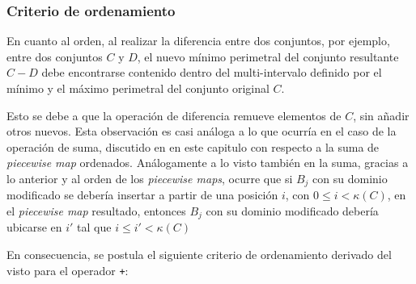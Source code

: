 \subsubsection{Criterio de ordenamiento}

En cuanto al orden, al realizar la diferencia entre dos conjuntos, por ejemplo, entre dos conjuntos $C$ y $D$, el nuevo mínimo perimetral del conjunto resultante $C - D$ debe encontrarse contenido dentro del multi-intervalo definido por el mínimo y el máximo perimetral del conjunto original $C$. 

Esto se debe a que la operación de diferencia remueve elementos de $C$, sin añadir otros nuevos. Esta observación es casi análoga a lo que ocurría en el caso de la operación de suma, discutido en en este capitulo con respecto a la suma de \textit{piecewise map} ordenados. Análogamente a lo visto también en la suma, gracias a lo anterior y al orden de los \textit{piecewise maps}, ocurre que si $B_j$ con su dominio modificado se debería insertar a partir de una posición $i$, con $0 \leq i < \kappa(C)$, en el \textit{piecewise map} resultado, entonces $B_j$ con su dominio modificado debería ubicarse en $i'$ tal que $i \leq i' < \kappa(C)$

En consecuencia, se postula el siguiente criterio de ordenamiento derivado del visto para el operador \texttt{+}:

\begin{center}
\end{center}



